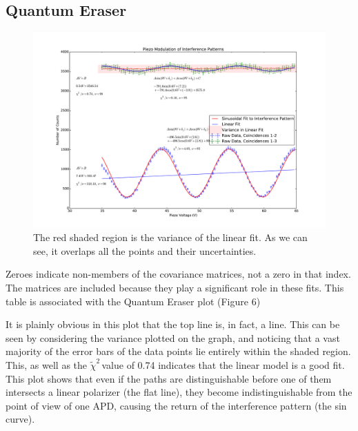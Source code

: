 \documentclass{article}
\newcommand{\redchi}{$\tilde{\chi}^2\,$}
\begin{document}
\subsection{Quantum Eraser}
\begin{figure}[!htb]
	\centering
	\includegraphics[scale=.55]{../plots/eraser.pdf}
	\caption{The red shaded region is the variance of the linear fit.  As we can see, it overlaps all the points and their uncertainties.}
\end{figure}

\begin{table}[!htb]
	\centering
   		\caption{Zeroes indicate non-members of the covariance matrices, not a zero in that index.  The matrices are included because they play a significant role in these fits.  This table is associated with the Quantum Eraser plot (Figure 6)}
\end{table}

It is plainly obvious in this plot that the top line is, in fact, a line.  This can be seen by considering the variance plotted on the graph, and noticing that a vast majority of the error bars of the data points lie entirely within the shaded region.  This, as well as the \redchi value of 0.74 indicates that the linear model is a good fit.  This plot shows that even if the paths are distinguishable before one of them intersects a linear polarizer (the flat line), they become indistinguishable from the point of view of one APD, causing the return of the interference pattern (the sin curve).
\end{document}
